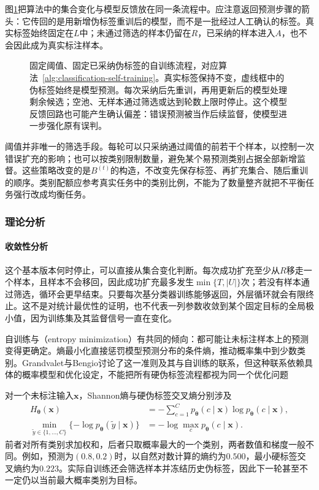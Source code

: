 图\ref{fig:classification-self-training}把算法中的集合变化与模型反馈放在同一条流程中。应注意返回预测步骤的箭头：它传回的是用新增伪标签重训后的模型，而不是一批经过人工确认的标签。真实标签始终固定在$L$中；未通过筛选的样本仍留在$R$，已采纳的样本进入$A$，也不会因此成为真实标注样本。

\begin{figure}[htbp]
  \centering
  
  \caption{固定阈值、固定已采纳伪标签的自训练流程，对应算法~\ref{alg:classification-self-training}。真实标签保持不变，虚线框中的伪标签始终是模型预测。每次采纳后先重训，再用更新后的模型处理剩余候选；空池、无样本通过筛选或达到轮数上限时停止。这个模型反馈回路也可能产生确认偏差：错误预测被当作后续监督，使模型进一步强化原有误判。}
  \label{fig:classification-self-training}
\end{figure}

阈值并非唯一的筛选手段。每轮可以只采纳通过阈值的前若干个样本，以控制一次错误扩充的影响；也可以按类别限制数量，避免某个易预测类别占据全部新增监督。这些策略改变的是$B^{(t)}$的构造，不改变先保存标签、再扩充集合、随后重训的顺序。类别配额应参考真实任务中的类别比例，不能为了数量整齐就把不平衡任务强行改成均衡任务。

\subsubsection{理论分析}
\label{sec:classification-self-training-analysis}

\paragraph{收敛性分析}
这个基本版本何时停止，可以直接从集合变化判断。每次成功扩充至少从$R$移走一个样本，且样本不会移回，因此成功扩充最多发生$\min\{T,|U|\}$次；若没有样本通过筛选，循环会更早结束。只要每次基分类器训练能够返回，外层循环就会有限终止。这不是对统计最优性的证明，也不代表一列参数收敛到某个固定目标的全局极小值，因为训练集及其监督信号一直在变化。

自训练与（entropy minimization）有共同的倾向：都可能让未标注样本上的预测变得更确定。熵最小化直接惩罚模型预测分布的条件熵，推动概率集中到少数类别。Grandvalet与Bengio讨论了这一准则及其与自训练的联系，但这种联系依赖具体的概率模型和优化设定，不能把所有硬伪标签流程都视为同一个优化问题

对一个未标注输入$\bm{x}$，Shannon熵与硬伪标签交叉熵分别涉及
\begin{equation}
  \label{eq:classification-pseudolabel-entropy}
  \begin{aligned}
    H_{\bm{\theta}}(\bm{x})
      &=-\sum_{c=1}^{C}p_{\bm{\theta}}(c\mid\bm{x})
        \log p_{\bm{\theta}}(c\mid\bm{x}),\\
    \min_{\widetilde y\in\{1,\dots,C\}}
      \{-\log p_{\bm{\theta}}(\widetilde y\mid\bm{x})\}
      &=-\log\max_c p_{\bm{\theta}}(c\mid\bm{x}).
  \end{aligned}
\end{equation}
前者对所有类别求加权和，后者只取概率最大的一个类别，两者数值和梯度一般不同。例如，预测为$(0.8,0.2)$时，以自然对数计算的熵约为$0.500$，最小硬标签交叉熵约为$0.223$。实际自训练还会筛选样本并冻结历史伪标签，因此下一轮甚至不一定仍以当前最大概率类别为目标。

